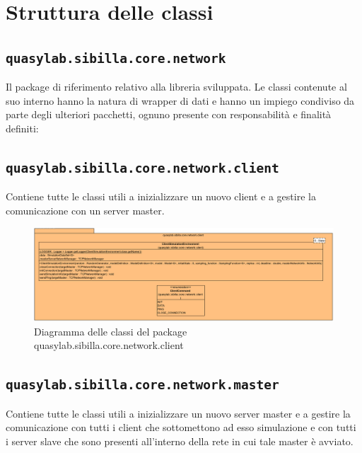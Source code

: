 

\section{Struttura delle classi}

\subsection{\texttt{quasylab.sibilla.core.network}}
Il package di riferimento relativo alla libreria sviluppata. Le classi contenute al suo interno hanno la natura di wrapper di dati e hanno un impiego condiviso da parte degli ulteriori pacchetti, ognuno presente con responsabilità e finalità definiti:

\subsection{\texttt{quasylab.sibilla.core.network.client}} Contiene tutte le classi utili a inizializzare un nuovo client e a gestire la comunicazione con un server master.

\begin{figure}[H]
    \includegraphics[width=\linewidth]{images/quasylab.sibilla.core.network.client.png}
    \captionsetup{justification=centering}
    \caption{Diagramma delle classi del package quasylab.sibilla.core.network.client}
  \end{figure}

\subsection{\texttt{quasylab.sibilla.core.network.master}} Contiene tutte le classi utili a inizializzare un nuovo server master e a gestire la comunicazione con tutti i client che sottomettono ad esso simulazione e con tutti i server slave che sono presenti all’interno della rete in cui tale master è avviato.

